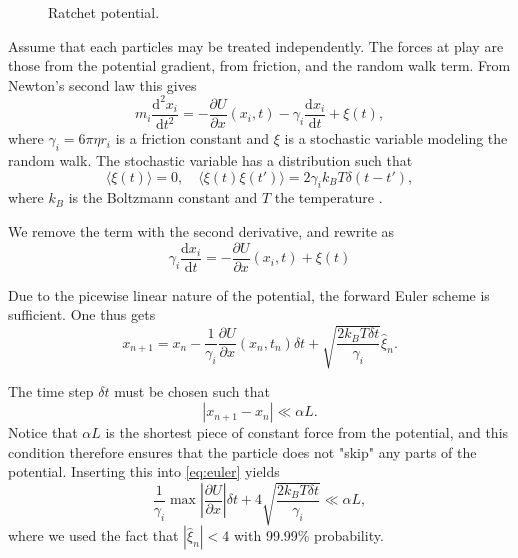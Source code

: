 \documentclass[a4paper, 12pt]{article}
\newcommand{\del}[2]{\frac{\partial #1}{\partial #2}}  %
\newcommand{\deriv}[2]{\frac{\mathrm{d} #1}{\mathrm{d} #2}}  %
\newcommand{\dderiv}[2]{\frac{\mathrm{d}^2 #1}{\mathrm{d} #2^2}}  %
\newcommand{\expval}[1]{\langle #1 \rangle}
\begin{document}
\begin{figure}[ht]
  \centering
  \caption{Ratchet potential. \label{fig:pot}}
\end{figure}

Assume that each particles may be treated independently.
The forces at play are those from the potential gradient, from friction, and the random walk term.
From Newton's second law this gives
\begin{equation}\label{eq:equation_of_motion}
m_i \dderiv{x_i}{t} =
-\del{U}{x} (x_i, t) - \gamma_i \deriv{x_i}{t} + \xi(t),
\end{equation}
where $\gamma_i = 6\pi \eta r_i$ is a friction constant and $\xi$ is a stochastic variable modeling the random walk.
The stochastic variable has a distribution such that
\begin{equation}
  \expval{\xi(t)} = 0, \quad \expval{\xi(t)\xi(t')} = 2\gamma_i k_B T \delta (t-t'),
\end{equation}
where $k_B$ is the Boltzmann constant and $T$ the temperature \cite{assignment}.

We remove the term with the second derivative, and rewrite as
\begin{equation}\label{eq:ode}
\gamma_i \deriv{x_i}{t} = -\del{U}{x}(x_i, t) + \xi(t)
\end{equation}


Due to the picewise linear nature of the potential, the forward Euler scheme is sufficient.
One thus gets \cite{assignment}
\begin{equation}\label{eq:euler}
x_{n+1} = x_n - \frac{1}{\gamma_i} \del{U}{x}(x_n, t_n) \delta t
+ \sqrt{\frac{2k_B T \delta t}{\gamma_i}} \hat{\xi}_n.
\end{equation}

The time step $\delta t$ must be chosen such that
$$
| x_{n+1} - x_n | \ll \alpha L.
$$
Notice that $\alpha L$ is the shortest piece of constant force from the potential, and this condition therefore ensures that the particle does not "skip" any parts of the potential.
Inserting this into \eqref{eq:euler} yields
\begin{equation}
\frac{1}{\gamma_i} \operatorname{max}\left| \del{U}{x} \right| \delta t + 4\sqrt{\frac{2k_B T \delta t}{\gamma_i}} \ll \alpha L,
\end{equation}
where we used the fact that $|\hat{\xi}_n|<4$ with 99.99\% probability.
\end{document}
